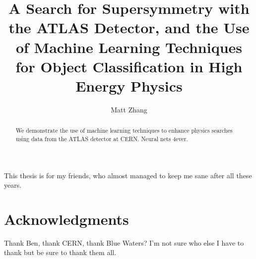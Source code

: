 \title{A Search for Supersymmetry with the ATLAS Detector, and the Use of Machine Learning Techniques for Object Classification in High Energy Physics}
\author{Matt Zhang}
\phdthesis
{}
\maketitle

\frontmatter

\begin{abstract}
We demonstrate the use of machine learning techniques to enhance physics searches using data from the ATLAS detector at CERN. Neural nets 4ever.
\end{abstract}

\begin{dedication}
This thesis is for my friends, who almost managed to keep me sane after all these years.
\end{dedication}

\chapter*{Acknowledgments}

Thank Ben, thank CERN, thank Blue Waters? I'm not sure who else I have to thank but be sure to thank them all.